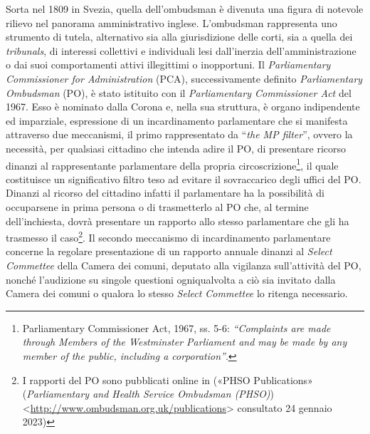 \documentclass[12pt,it,a4paper,]{report}
\begin{document}
Sorta nel 1809 in Svezia, quella dell'ombudsman è divenuta una figura di
notevole rilievo nel panorama amministrativo inglese. L'ombudsman
rappresenta uno strumento di tutela, alternativo sia alla giurisdizione
delle corti, sia a quella dei \emph{tribunals}, di interessi collettivi
e individuali lesi dall'inerzia dell'amministrazione o dai suoi
comportamenti attivi illegittimi o inopportuni. Il \emph{Parliamentary
Commissioner for Administration} (PCA), successivamente definito
\emph{Parliamentary Ombudsman} (PO), è stato istituito con il
\emph{Parliamentary Commissioner Act} del 1967. Esso è nominato dalla
Corona e, nella sua struttura, è organo indipendente ed imparziale,
espressione di un incardinamento parlamentare che si manifesta
attraverso due meccanismi, il primo rappresentato da ``\emph{the MP
filter}'', ovvero la necessità, per qualsiasi cittadino che intenda
adire il PO, di presentare ricorso dinanzi al rappresentante
parlamentare della propria circoscrizione\footnote{Parliamentary
  Commissioner Act, 1967, ss. 5-6: \emph{``Complaints are made through
  Members of the Westminster Parliament and may be made by any member of
  the public, including a corporation''}.}, il quale costituisce un
significativo filtro teso ad evitare il sovraccarico degli uffici del
PO. Dinanzi al ricorso del cittadino infatti il parlamentare ha la
possibilità di occuparsene in prima persona o di trasmetterlo al PO che,
al termine dell'inchiesta, dovrà presentare un rapporto allo stesso
parlamentare che gli ha trasmesso il caso\footnote{I rapporti del PO
  sono pubblicati online in ({«PHSO Publications»} (\emph{Parliamentary
  and Health Service Ombudsman (PHSO)})
  \textless{}\url{http://www.ombudsman.org.uk/publications}\textgreater{}
  consultato 24 gennaio 2023)}. Il secondo meccanismo di incardinamento
parlamentare concerne la regolare presentazione di un rapporto annuale
dinanzi al \emph{Select Commettee} della Camera dei comuni, deputato
alla vigilanza sull'attività del PO, nonché l'audizione su singole
questioni ogniqualvolta a ciò sia invitato dalla Camera dei comuni o
qualora lo stesso \emph{Select Commettee} lo ritenga necessario.
\end{document}
